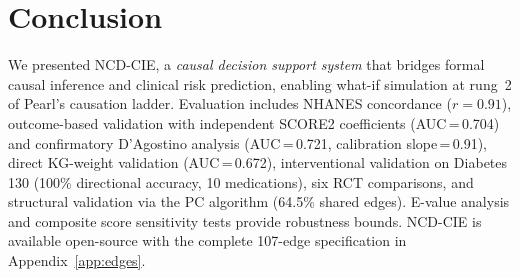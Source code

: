 \documentclass[runningheads]{llncs}
\begin{document}
\section{Conclusion}\label{sec:conclusion}

We presented NCD-CIE, a \emph{causal decision support system}
that bridges formal causal inference and clinical risk prediction,
enabling what-if simulation at rung~2 of Pearl's causation ladder.
Evaluation includes NHANES concordance ($r = 0.91$), outcome-based
validation with independent SCORE2 coefficients (AUC\,=\,0.704)
and confirmatory D'Agostino analysis (AUC\,=\,0.721,
calibration slope\,=\,0.91), direct KG-weight validation
(AUC\,=\,0.672), interventional validation on Diabetes\,130
(100\% directional accuracy, 10 medications), six RCT comparisons,
and structural validation via the PC algorithm (64.5\% shared edges).
E-value analysis and composite score sensitivity tests provide
robustness bounds.
NCD-CIE is available open-source with the complete 107-edge
specification in Appendix~\ref{app:edges}.
\end{document}
